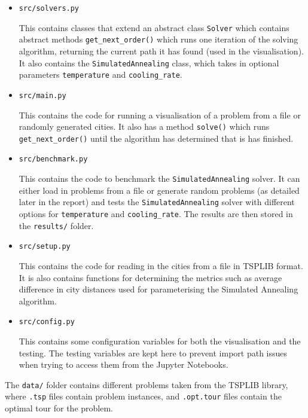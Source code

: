 \documentclass{article}
\begin{document}
\begin{itemize}
    \item \texttt{src/solvers.py} 
    
    This contains classes that extend an abstract class \texttt{Solver} which contains abstract methods \texttt{get\_next\_order()} which runs one iteration of the solving algorithm, returning the current path it has found (used in the visualisation).
    It also contains the \texttt{SimulatedAnnealing} class, which takes in optional parameters \texttt{temperature} and \texttt{cooling\_rate}.
    
    \item \texttt{src/main.py} 
    
    This contains the code for running a visualisation of a problem from a file or randomly generated cities.
    It also has a method \texttt{solve()} which runs \texttt{get\_next\_order()} until the algorithm has determined that is has finished.
    
    \item \texttt{src/benchmark.py}
    
    This contains the code to benchmark the \texttt{SimulatedAnnealing} solver.
    It can either load in problems from a file or generate random problems (as detailed later in the report) and tests the \texttt{SimulatedAnnealing} solver with different options for \texttt{temperature} and \texttt{cooling\_rate}.
    The results are then stored in the \texttt{results/} folder.
    
    \item \texttt{src/setup.py}
    
    This contains the code for reading in the cities from a file in TSPLIB format.
    It is also contains functions for determining the metrics such as average difference in city distances used for parameterising the Simulated Annealing algorithm.
    
    \item \texttt{src/config.py}
    
    This contains some configuration variables for both the visualisation and the testing.
    The testing variables are kept here to prevent import path issues when trying to access them from the Jupyter Notebooks.
    
\end{itemize}

The \texttt{data/} folder contains different problems taken from the TSPLIB library, where \texttt{.tsp} files contain problem instances, and \texttt{.opt.tour} files contain the optimal tour for the problem.
\\
\end{document}
